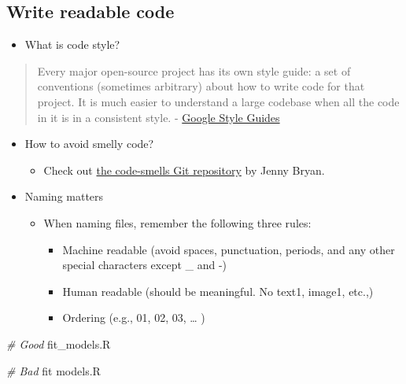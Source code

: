 \documentclass[
]{book}
\newenvironment{Shaded}{\begin{snugshade}}{\end{snugshade}}
\newcommand{\CommentTok}[1]{\textcolor[rgb]{0.56,0.35,0.01}{\textit{#1}}}
\newcommand{\NormalTok}[1]{#1}
\providecommand{\tightlist}{%
  \setlength{\itemsep}{0pt}\setlength{\parskip}{0pt}}
\begin{document}
\hypertarget{write-readable-code}{%
\subsection{Write readable code}\label{write-readable-code}}

\begin{itemize}
\tightlist
\item
  What is code style?
\end{itemize}

\begin{quote}
Every major open-source project has its own style guide: a set of conventions (sometimes arbitrary) about how to write code for that project. It is much easier to understand a large codebase when all the code in it is in a consistent style. - \href{https://google.github.io/styleguide/}{Google Style Guides}
\end{quote}

\begin{itemize}
\item
  How to avoid smelly code?

  \begin{itemize}
  \tightlist
  \item
    Check out \href{https://github.com/jennybc/code-smells-and-feels\#readme}{the code-smells Git repository} by Jenny Bryan.
  \end{itemize}
\end{itemize}

\begin{itemize}
\item
  Naming matters

  \begin{itemize}
  \tightlist
  \item
    When naming files, remember the following three rules:

    \begin{itemize}
    \tightlist
    \item
      Machine readable (avoid spaces, punctuation, periods, and any other special characters except \_ and -)
    \item
      Human readable (should be meaningful. No text1, image1, etc.,)
    \item
      Ordering (e.g., 01, 02, 03, \ldots{} )
    \end{itemize}
  \end{itemize}
\end{itemize}

\begin{Shaded}
\begin{Highlighting}[]
\CommentTok{\# Good}
\NormalTok{fit\_models.R}

\CommentTok{\# Bad}
\NormalTok{fit models.R}
\end{Highlighting}
\end{Shaded}
\end{document}
